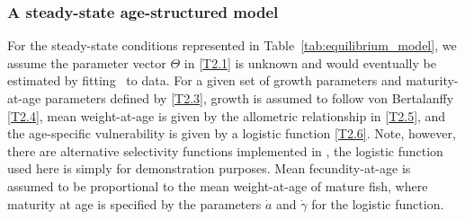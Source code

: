 \begin{multicols}{2}
\subsubsection{A steady-state age-structured model} %
\label{ssub:a_steady_state_age_structured_model}


For the steady-state conditions represented in Table~\ref{tab:equilibrium_model}, we assume the parameter vector $\Theta$ in \eqref{T2.1} is unknown and would eventually be estimated by fitting \iscam\ to data.  For a given set of growth parameters and maturity-at-age parameters defined by \eqref{T2.3}, growth is assumed to follow von Bertalanffy \eqref{T2.4}, mean weight-at-age is given by the allometric relationship in \eqref{T2.5}, and the age-specific vulnerability is given by a logistic function \eqref{T2.6}.  Note, however, there are alternative selectivity functions implemented in \iscam, the logistic function used here is simply for demonstration purposes.  Mean fecundity-at-age is assumed to be proportional to the mean weight-at-age of mature fish, where maturity at age is specified by the parameters $\dot{a}$ and $\dot{\gamma}$ for the logistic function.


\end{multicols}
